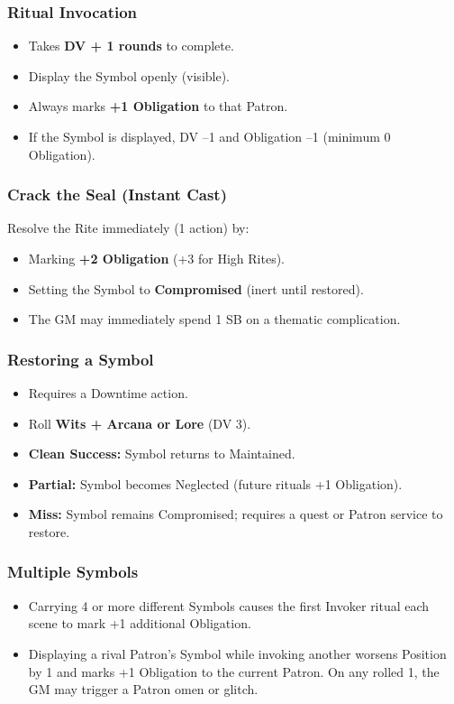 \subsubsection{Ritual Invocation}
\begin{itemize}
  \item Takes \textbf{DV + 1 rounds} to complete.
  \item Display the Symbol openly (visible).
  \item Always marks \textbf{+1 Obligation} to that Patron.
  \item If the Symbol is displayed, DV --1 and Obligation --1 (minimum 0 Obligation).
\end{itemize}

\subsubsection{Crack the Seal (Instant Cast)}
Resolve the Rite immediately (1 action) by:
\begin{itemize}
  \item Marking \textbf{+2 Obligation} (+3 for High Rites).
  \item Setting the Symbol to \textbf{Compromised} (inert until restored).
  \item The GM may immediately spend 1 SB on a thematic complication.
\end{itemize}

\subsubsection{Restoring a Symbol}
\begin{itemize}
  \item Requires a Downtime action.
  \item Roll \textbf{Wits + Arcana or Lore} (DV 3).
  \item \textbf{Clean Success:} Symbol returns to Maintained.
  \item \textbf{Partial:} Symbol becomes Neglected (future rituals +1 Obligation).
  \item \textbf{Miss:} Symbol remains Compromised; requires a quest or Patron service to restore.
\end{itemize}

\subsubsection{Multiple Symbols}
\begin{itemize}
  \item Carrying 4 or more different Symbols causes the first Invoker ritual each scene to mark +1 additional Obligation.
  \item Displaying a rival Patron's Symbol while invoking another worsens Position by 1 and marks +1 Obligation to the current Patron. On any rolled 1, the GM may trigger a Patron omen or glitch.
\end{itemize}

